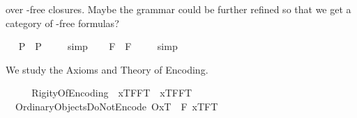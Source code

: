 \begin{isabellebody}
\begin{isamarkuptext}
 over \isa{\isactrlbold {\isasymbox}}-free closures. Maybe the grammar could be further refined so that we get a 
 category of \isa{\isactrlbold {\isasymbox}}-free formulas?%
\end{isamarkuptext}%
\isamarkuptrue%
\ \isamarkupfalse%
\ {\isachardoublequoteopen}{\isacharbrackleft}\isactrlbold {\isasymA}{\isasymphi}\isactrlsup P\ \isactrlbold {\isasymrightarrow}\ \isactrlbold {\isasymbox}{\isacharparenleft}\isactrlbold {\isasymA}{\isasymphi}\isactrlsup P{\isacharparenright}{\isacharbrackright}\ {\isacharequal}\ {\isasymtop}{\isachardoublequoteclose}%
\isadelimproof
\ %
\endisadelimproof
%
\isatagproof
{}\isamarkupfalse%
\ simp\ \isamarkupfalse%
%
\endisatagproof
{\isafoldproof}%
%
\isadelimproof
%
\endisadelimproof
\isanewline
\ \isamarkupfalse%
\ {\isachardoublequoteopen}{\isacharbrackleft}\isactrlbold {\isasymA}{\isasymphi}\isactrlsup F\ \isactrlbold {\isasymrightarrow}\ \isactrlbold {\isasymbox}{\isacharparenleft}\isactrlbold {\isasymA}{\isasymphi}\isactrlsup F{\isacharparenright}{\isacharbrackright}\ {\isacharequal}\ {\isasymtop}{\isachardoublequoteclose}%
\isadelimproof
\ %
\endisadelimproof
%
\isatagproof
{}\isamarkupfalse%
\ simp\ \isamarkupfalse%
%
\endisatagproof
{\isafoldproof}%
%
\isadelimproof
%
\endisadelimproof
%
\isamarkuptrue%
%
\begin{isamarkuptext}%
We study the Axioms and Theory of Encoding.%
\end{isamarkuptext}%
\isamarkuptrue%
\ \isamarkupfalse%
\ \isanewline
\ \ RigityOfEncoding{\isacharcolon}\ \ {\isachardoublequoteopen}{\isacharbrackleft}{\isasymlbrace}x\isactrlsup T{\isacharcomma}FF\isactrlsup T{\isasymrbrace}\ \isactrlbold {\isasymrightarrow}\ \isactrlbold {\isasymbox}{\isasymlbrace}x\isactrlsup T{\isacharcomma}FF\isactrlsup T{\isasymrbrace}{\isacharbrackright}\ {\isacharequal}\ {\isasymtop}{\isachardoublequoteclose}\ \isanewline
\ \ OrdinaryObjectsDoNotEncode{\isacharcolon}\ {\isachardoublequoteopen}{\isacharbrackleft}{\isasymlparr}O{\isacharbang}{\isacharcomma}x\isactrlsup T{\isasymrparr}\ \isactrlbold {\isasymrightarrow}\ \isactrlbold {\isasymbox}{\isacharparenleft}\isactrlbold {\isasymnot}{\isacharparenleft}\isactrlbold {\isasymexists}F{\isachardot}\ {\isasymlbrace}x\isactrlsup T{\isacharcomma}F\isactrlsup T{\isasymrbrace}{\isacharparenright}{\isacharparenright}{\isacharbrackright}\ {\isacharequal}\ {\isasymtop}{\isachardoublequoteclose}\ \isanewline

\end{isabellebody}

